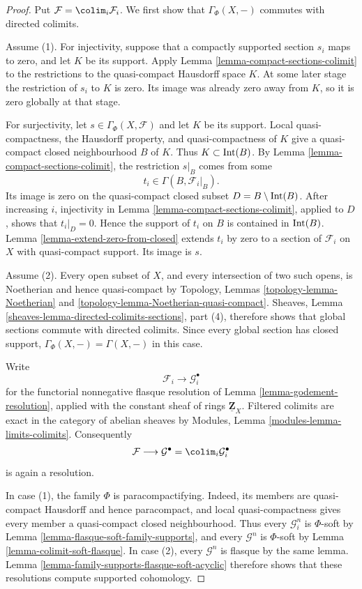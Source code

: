 \begin{proof}
Put $\mathcal{F} = \colim_i \mathcal{F}_i$. We first show that
$\Gamma_\Phi(X, -)$ commutes with directed colimits.

Assume (1). For injectivity, suppose that a compactly supported section
$s_i$ maps to zero, and let $K$ be its support. Apply Lemma
\ref{lemma-compact-sections-colimit} to the restrictions to the
quasi-compact Hausdorff space $K$. At some later stage the restriction of
$s_i$ to $K$ is zero. Its image was already zero away from $K$, so it is
zero globally at that stage.

For surjectivity, let $s \in \Gamma_\Phi(X, \mathcal{F})$ and let $K$ be
its support. Local quasi-compactness, the Hausdorff property, and
quasi-compactness of $K$ give a quasi-compact closed neighbourhood $B$ of
$K$. Thus $K \subset \mathop{\rm Int}(B)$. By Lemma
\ref{lemma-compact-sections-colimit}, the restriction $s|_B$ comes from
some
$$
t_i \in \Gamma(B, \mathcal{F}_i|_B).
$$
Its image is zero on the quasi-compact closed subset
$D = B \setminus \mathop{\rm Int}(B)$. After increasing $i$, injectivity
in Lemma \ref{lemma-compact-sections-colimit}, applied to $D$, shows that
$t_i|_D=0$. Hence the support of $t_i$ on $B$ is contained in
$\mathop{\rm Int}(B)$. Lemma \ref{lemma-extend-zero-from-closed} extends
$t_i$ by zero to a section of $\mathcal{F}_i$ on $X$ with quasi-compact
support. Its image is $s$.

Assume (2). Every open subset of $X$, and every intersection of two such
opens, is Noetherian and hence quasi-compact by Topology, Lemmas
\ref{topology-lemma-Noetherian} and
\ref{topology-lemma-Noetherian-quasi-compact}. Sheaves, Lemma
\ref{sheaves-lemma-directed-colimits-sections}, part (4), therefore shows
that global sections commute with directed colimits. Since every global
section has closed support, $\Gamma_\Phi(X, -)=\Gamma(X, -)$ in this case.

Write
$$
\mathcal{F}_i \longrightarrow \mathcal{G}_i^\bullet
$$
for the functorial nonnegative flasque resolution of Lemma
\ref{lemma-godement-resolution}, applied with the constant sheaf of rings
$\underline{\mathbf{Z}}_X$. Filtered colimits are exact in the category of
abelian sheaves by Modules, Lemma
\ref{modules-lemma-limits-colimits}. Consequently
$$
\mathcal{F} \longrightarrow
\mathcal{G}^\bullet = \colim_i \mathcal{G}_i^\bullet
$$
is again a resolution.

In case (1), the family $\Phi$ is paracompactifying. Indeed, its members
are quasi-compact Hausdorff and hence paracompact, and local
quasi-compactness gives every member a quasi-compact closed neighbourhood.
Thus every $\mathcal{G}_i^n$ is $\Phi$-soft by Lemma
\ref{lemma-flasque-soft-family-supports}, and every $\mathcal{G}^n$ is
$\Phi$-soft by Lemma \ref{lemma-colimit-soft-flasque}. In case (2), every
$\mathcal{G}^n$ is flasque by the same lemma. Lemma
\ref{lemma-family-supports-flasque-soft-acyclic} therefore shows that these
resolutions compute supported cohomology.


\end{proof}
